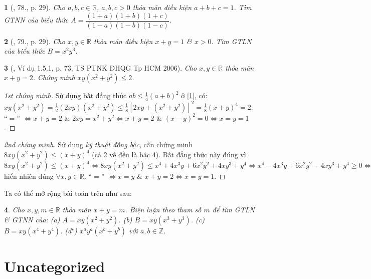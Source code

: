 \documentclass{article}
\newtheorem{baitoan}{}
\begin{document}
\begin{baitoan}[\cite{Tuyen_Toan_9_old}, 78., p. 29]
	Cho $a,b,c\in\mathbb{R}$, $a,b,c > 0$ thỏa mãn điều kiện $a + b + c = 1$. Tìm {\rm GTNN} của biểu thức $A = \dfrac{(1 + a)(1 + b)(1 + c)}{(1 - a)(1 - b)(1 - c)}$.
\end{baitoan}

\begin{baitoan}[\cite{Tuyen_Toan_9_old}, 79., p. 29]
	Cho $x,y\in\mathbb{R}$ thỏa mãn điều kiện $x + y = 1$ \& $x > 0$. Tìm {\rm GTLN} của biểu thức $B = x^2y^3$.
\end{baitoan}

\begin{baitoan}[\cite{Dung_Can_Anh_BDT_8_9}, Ví dụ 1.5.1, p. 73, TS PTNK ĐHQG Tp HCM 2006]
	Cho $x,y\in\mathbb{R}$ thỏa mãn $x + y = 2$. Chứng minh $xy(x^2 + y^2)\le2$.
\end{baitoan}

\begin{proof}[1st chứng minh]
	Sử dụng bất đẳng thức $ab\le\frac{1}{4}(a + b)^2$ ở \eqref{1}, có: $xy(x^2 + y^2) = \frac{1}{2}(2xy)(x^2 + y^2)\le\frac{1}{8}[2xy + (x^2 + y^2)]^2 = \frac{1}{8}(x + y)^4 = 2$. ``$=$'' $\Leftrightarrow x + y = 2$ \& $2xy = x^2 + y^2\Leftrightarrow x + y = 2$ \& $(x - y)^2 = 0\Leftrightarrow x = y = 1$.
\end{proof}

\begin{proof}[2nd chứng minh]
	Sử dụng \textit{kỹ thuật đồng bậc}, cần chứng minh $8xy(x^2 + y^2)\le(x + y)^4$ (cả 2 vế đều là bậc 4). Bất đẳng thức này đúng vì $8xy(x^2 + y^2)\le(x + y)^4\Leftrightarrow8xy(x^2 + y^2)\le x^4 + 4x^3y + 6x^2y^2 + 4xy^3 + y^4\Leftrightarrow x^4 - 4x^3y + 6x^2y^2 - 4xy^3 + y^4\ge0\Leftrightarrow(x - y)^4\ge0$ hiển nhiên đúng $\forall x,y\in\mathbb{R}$. ``$=$'' $\Leftrightarrow x = y$ \& $x + y = 2\Leftrightarrow x = y = 1$.
\end{proof}
Ta có thể mở rộng bài toán trên như sau:

\begin{baitoan}
	Cho $x,y,m\in\mathbb{R}$ thỏa mãn $x + y = m$. Biện luận theo tham số $m$ để tìm {\rm GTLN} \& {\rm GTNN} của: (a) $A = xy(x^2 + y^2)$. (b) $B = xy(x^3 + y^3)$. (c) $B = xy(x^4 + y^4)$. (d${}^\star$) $x^ay^a(x^b + y^b)$ với $a,b\in\mathbb{Z}$. 
\end{baitoan}


\section{Uncategorized}
\end{document}
